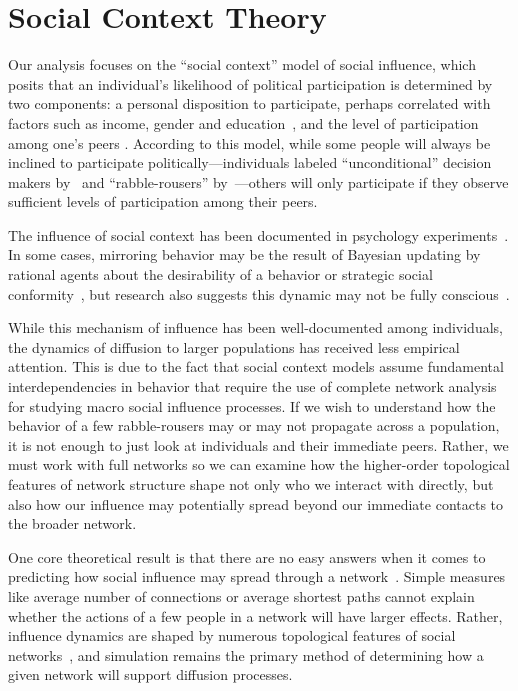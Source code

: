 \documentclass[12pt]{article}
\begin{document}
\section{Social Context Theory}


Our analysis focuses on the ``social context'' model of social influence, which posits that an individual's likelihood of political participation is determined by two components: a personal disposition to participate, perhaps correlated with factors such as income, gender and education~\citep{wolfinger1980votes}, and the level of participation among one's peers \citep{Fowler:2005ts,Siegel:2009vi,Rolfe:2012ka}. According to this model, while some people will always be inclined to participate politically---individuals labeled ``unconditional'' decision makers by~\citet{Rolfe:2012ka} and ``rabble-rousers'' by~\citet{Siegel:2009vi}---others will only participate if they observe sufficient levels of participation among their peers.

The influence of social context has been documented in psychology experiments~\citep{ross2011person}.  In some cases, mirroring behavior may be the result of Bayesian updating by rational agents about the desirability of a behavior or strategic social conformity~\citep{goyal2012connections}, but research also suggests this dynamic may not be fully conscious~\citep{Cialdini:2015gt}.

While this mechanism of influence has been well-documented among individuals, the dynamics of diffusion to larger populations has received less empirical attention. This is due to the fact that social context models assume fundamental interdependencies in behavior that require the use of complete network analysis for studying macro social influence processes. If we wish to understand how the behavior of a few rabble-rousers may or may not propagate across a population, it is not enough to just look at individuals and their immediate peers. Rather, we must work with full networks so we can examine how the higher-order topological features of network structure shape not only who we interact with directly, but also how our influence may potentially spread beyond our immediate contacts to the broader network.

One core theoretical result is that there are no easy answers when it comes to predicting how social influence may spread through a network~\citep{centola2007complex,jackson2010diffusion}. Simple measures like average number of connections or average shortest paths cannot explain whether the actions of a few people in a network will have larger effects. Rather, influence dynamics are shaped by numerous topological features of social networks~\citep{centola2015social}, and simulation remains the primary method of determining how a given network will support diffusion processes.
\end{document}

